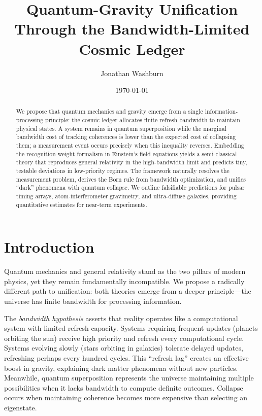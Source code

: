 \documentclass[twocolumn,prd,amsmath,amssymb,aps,superscriptaddress,nofootinbib]{revtex4-2}
\begin{document}
\title{Quantum-Gravity Unification Through the Bandwidth-Limited Cosmic Ledger}

\author{Jonathan Washburn}

\date{\today}

\begin{abstract}
We propose that quantum mechanics and gravity emerge from a single information-processing principle: the cosmic ledger allocates finite refresh bandwidth to maintain physical states. A system remains in quantum superposition while the marginal bandwidth cost of tracking coherences is lower than the expected cost of collapsing them; a measurement event occurs precisely when this inequality reverses. Embedding the recognition-weight formalism in Einstein's field equations yields a semi-classical theory that reproduces general relativity in the high-bandwidth limit and predicts tiny, testable deviations in low-priority regimes. The framework naturally resolves the measurement problem, derives the Born rule from bandwidth optimization, and unifies ``dark'' phenomena with quantum collapse. We outline falsifiable predictions for pulsar timing arrays, atom-interferometer gravimetry, and ultra-diffuse galaxies, providing quantitative estimates for near-term experiments.
\end{abstract}

\maketitle

\section{Introduction}
\label{sec:intro}

Quantum mechanics and general relativity stand as the two pillars of modern physics, yet they remain fundamentally incompatible. We propose a radically different path to unification: both theories emerge from a deeper principle—the universe has finite bandwidth for processing information.

The \textit{bandwidth hypothesis} asserts that reality operates like a computational system with limited refresh capacity. Systems requiring frequent updates (planets orbiting the sun) receive high priority and refresh every computational cycle. Systems evolving slowly (stars orbiting in galaxies) tolerate delayed updates, refreshing perhaps every hundred cycles. This ``refresh lag'' creates an effective boost in gravity, explaining dark matter phenomena without new particles. Meanwhile, quantum superposition represents the universe maintaining multiple possibilities when it lacks bandwidth to compute definite outcomes. Collapse occurs when maintaining coherence becomes more expensive than selecting an eigenstate.
\end{document}

